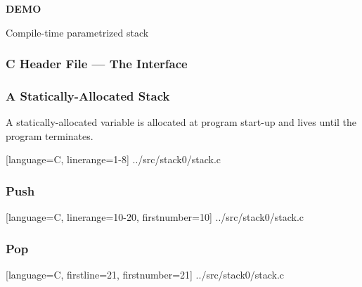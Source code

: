 \begin{frame}

\begin{center}

\Huge \textbf{DEMO}

\bigskip

\large Compile-time parametrized stack

\end{center}

\end{frame}


\begin{frame}[fragile]

\frametitle{C Header File --- The Interface}



\end{frame}


\begin{frame}[fragile]

\frametitle{A Statically-Allocated Stack}

\begin{center}

A statically-allocated variable is allocated at program start-up and lives
until the program terminates.

\end{center}

\pause

\vspace{\fill}

%
  [language=C, linerange={1-8}]%
  {../src/stack0/stack.c}

\end{frame}


\begin{frame}[fragile]

\frametitle{Push}

%
  [language=C, linerange={10-20}, firstnumber=10]%
  {../src/stack0/stack.c}

\end{frame}


\begin{frame}[fragile]

\frametitle{Pop}

%
  [language=C, firstline=21, firstnumber=21]%
  {../src/stack0/stack.c}

\end{frame}


